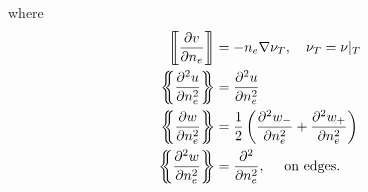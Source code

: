 where
\begin{align*}
    \jump{ \frac{\partial v}{\partial n_{e}} } &= - n_{e} \nabla \nu_{T} , \quad \nu _{T} = \nu |_{T}   \\
    \mean{ \frac{\partial ^2 u}{\partial n_{e}^2  } }  & = \frac{\partial ^2 u }{\partial n_{e} ^2 }  \\
    \mean{ \frac{\partial w}{\partial n^2_{e}} }  &=  \frac{1}{2} \left( \frac{\partial^2 w_{-} }{\partial n^2_{e} } +
    \frac{\partial ^2 w_{+}}{\partial n^2_{e} }   \right) \\
    \mean{ \frac{\partial ^2 w}{\partial n^2_{e} } } & = \frac{\partial ^2}{\partial n^2_{e}}, \quad \text{ on edges}
.\end{align*}






